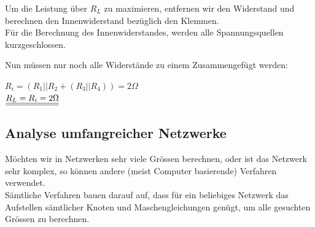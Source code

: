 \beginbsp
Um die Leistung über $R_L$ zu maximieren, entfernen wir den Widerstand und berechnen den Innenwiderstand bezüglich den Klemmen. \\
Für die Berechnung des Innenwiderstandes, werden alle Spannungsquellen kurzgeschlossen.
\begin{center}
\end{center}
Nun müssen nur noch alle Widerstände zu einem Zusammengefügt werden:
\begin{center}
	$R_i = (R_1 || R_2 + (R_3 || R_4 )) = 2 \Omega$ \\
	$\underline{\underline{ R_L = R_i = 2 \Omega}}$
\end{center}
\iend










										 \newpage





					          \subsection{Analyse umfangreicher Netzwerke}

					           Möchten wir in Netzwerken sehr viele Grössen berechnen, oder ist das Netzwerk sehr komplex, so können andere (meist Computer basierende) Verfahren verwendet. \\
					           Sämtliche Verfahren bauen darauf auf, dass für ein beliebiges Netzwerk das Aufstellen sämtlicher Knoten und Maschengleichungen genügt, um alle gesuchten Grössen zu berechnen. \\

